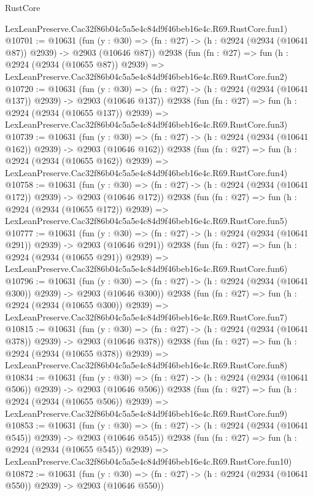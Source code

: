 \begin{lexlean}{RustCore}
\begin{coremodule}
    LexLeanPreserve.Cac32f86b04c5a5e4c84d9f46beb16e4c.R69.RustCore.fun1)
@10701 := @10631
    (fun (y : @30) => (fn : @27) -> (h : @2924 (@2934 (@10641 @87)) @2939) -> @2903 (@10646 @87))
    @2938
    (fun (fn : @27) =>
    fun (h : @2924 (@2934 (@10655 @87)) @2939) =>
    LexLeanPreserve.Cac32f86b04c5a5e4c84d9f46beb16e4c.R69.RustCore.fun2)
@10720 := @10631
    (fun (y : @30) => (fn : @27) -> (h : @2924 (@2934 (@10641 @137)) @2939) -> @2903 (@10646 @137))
    @2938
    (fun (fn : @27) =>
    fun (h : @2924 (@2934 (@10655 @137)) @2939) =>
    LexLeanPreserve.Cac32f86b04c5a5e4c84d9f46beb16e4c.R69.RustCore.fun3)
@10739 := @10631
    (fun (y : @30) => (fn : @27) -> (h : @2924 (@2934 (@10641 @162)) @2939) -> @2903 (@10646 @162))
    @2938
    (fun (fn : @27) =>
    fun (h : @2924 (@2934 (@10655 @162)) @2939) =>
    LexLeanPreserve.Cac32f86b04c5a5e4c84d9f46beb16e4c.R69.RustCore.fun4)
@10758 := @10631
    (fun (y : @30) => (fn : @27) -> (h : @2924 (@2934 (@10641 @172)) @2939) -> @2903 (@10646 @172))
    @2938
    (fun (fn : @27) =>
    fun (h : @2924 (@2934 (@10655 @172)) @2939) =>
    LexLeanPreserve.Cac32f86b04c5a5e4c84d9f46beb16e4c.R69.RustCore.fun5)
@10777 := @10631
    (fun (y : @30) => (fn : @27) -> (h : @2924 (@2934 (@10641 @291)) @2939) -> @2903 (@10646 @291))
    @2938
    (fun (fn : @27) =>
    fun (h : @2924 (@2934 (@10655 @291)) @2939) =>
    LexLeanPreserve.Cac32f86b04c5a5e4c84d9f46beb16e4c.R69.RustCore.fun6)
@10796 := @10631
    (fun (y : @30) => (fn : @27) -> (h : @2924 (@2934 (@10641 @300)) @2939) -> @2903 (@10646 @300))
    @2938
    (fun (fn : @27) =>
    fun (h : @2924 (@2934 (@10655 @300)) @2939) =>
    LexLeanPreserve.Cac32f86b04c5a5e4c84d9f46beb16e4c.R69.RustCore.fun7)
@10815 := @10631
    (fun (y : @30) => (fn : @27) -> (h : @2924 (@2934 (@10641 @378)) @2939) -> @2903 (@10646 @378))
    @2938
    (fun (fn : @27) =>
    fun (h : @2924 (@2934 (@10655 @378)) @2939) =>
    LexLeanPreserve.Cac32f86b04c5a5e4c84d9f46beb16e4c.R69.RustCore.fun8)
@10834 := @10631
    (fun (y : @30) => (fn : @27) -> (h : @2924 (@2934 (@10641 @506)) @2939) -> @2903 (@10646 @506))
    @2938
    (fun (fn : @27) =>
    fun (h : @2924 (@2934 (@10655 @506)) @2939) =>
    LexLeanPreserve.Cac32f86b04c5a5e4c84d9f46beb16e4c.R69.RustCore.fun9)
@10853 := @10631
    (fun (y : @30) => (fn : @27) -> (h : @2924 (@2934 (@10641 @545)) @2939) -> @2903 (@10646 @545))
    @2938
    (fun (fn : @27) =>
    fun (h : @2924 (@2934 (@10655 @545)) @2939) =>
    LexLeanPreserve.Cac32f86b04c5a5e4c84d9f46beb16e4c.R69.RustCore.fun10)
@10872 := @10631
    (fun (y : @30) => (fn : @27) -> (h : @2924 (@2934 (@10641 @550)) @2939) -> @2903 (@10646 @550))

\end{coremodule}
\end{lexlean}
